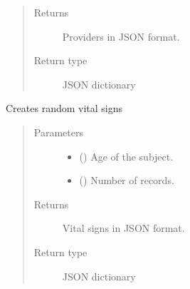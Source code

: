\documentclass[letterpaper,10pt,english]{sphinxmanual}
\begin{document}
\begin{fulllineitems}
\begin{fulllineitems}
\begin{quote}
\begin{description}
\begin{itemize}
\end{itemize}

\item[{Returns}] \leavevmode
\sphinxAtStartPar
Providers in JSON format.

\item[{Return type}] \leavevmode
\sphinxAtStartPar
JSON dictionary

\end{description}\end{quote}

\end{fulllineitems}


\begin{fulllineitems}
\label{\detokenize{CE_app.synth_phr:CE_app.synth_phr.functions.Domains.vital}}
\sphinxAtStartPar
Creates random vital signs
\begin{quote}\begin{description}
\item[{Parameters}] \leavevmode\begin{itemize}
\item {} 
\sphinxAtStartPar
{} () \textendash{} Age of the subject.

\item {} 
\sphinxAtStartPar
{} () \textendash{} Number of records.

\end{itemize}

\item[{Returns}] \leavevmode
\sphinxAtStartPar
Vital signs in JSON format.

\item[{Return type}] \leavevmode
\sphinxAtStartPar
JSON dictionary

\end{description}\end{quote}

\end{fulllineitems}


\end{fulllineitems}
\end{document}
